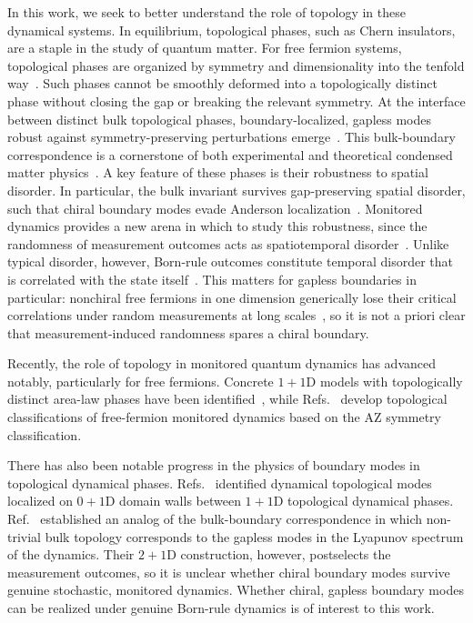 \documentclass[aps,prb,10pt,twocolumn,superscriptaddress,longbibliography,floatfix]{revtex4-2}
\newcommand{\claudeadd}[1]{{\color{orange}#1}}
\begin{document}
In this work, we seek to better understand the role of topology in these dynamical systems. In equilibrium, topological phases, such as Chern insulators, are a staple in
the study of quantum matter. For free fermion systems, topological phases are \claudeadd{organized by symmetry and dimensionality into the tenfold way}~\cite{AltlandZirnbauer1997,SchnyderRyuFurusakiLudwig2008,Kitaev2009,RyuSchnyderFurusakiLudwig2010,ChiuTeoSchnyderRyu2016}.
Such phases cannot be smoothly deformed into a topologically distinct phase without closing the gap or breaking the relevant symmetry. At the interface between distinct bulk topological phases, boundary-localized, gapless modes robust against symmetry-preserving
perturbations emerge~\cite{Halperin1982,Hatsugai1993,TeoKane2010}. This bulk-boundary correspondence is a cornerstone of both experimental and theoretical condensed matter physics~\cite{HasanKane2010,QiZhang2011}. A key feature of these phases is their robustness to spatial disorder. In particular, the bulk invariant survives gap-preserving spatial disorder, such that chiral boundary modes 
evade Anderson localization~\cite{Halperin1982,EversMirlin2008}. Monitored dynamics provides a new arena in which to study this robustness, since the randomness of measurement outcomes acts as spatiotemporal disorder~\cite{JianBauerKeselmanLudwig2022}. \claudeadd{Unlike typical disorder, however, Born-rule outcomes constitute temporal disorder that is correlated with the state itself}~\cite{JianShapourianBauerLudwig2023,FavaEtAl2023}. \claudeadd{This matters for gapless boundaries in particular: nonchiral free fermions in one dimension generically lose their critical correlations under random measurements at long scales~\cite{PoboikoEtAl2023}, so it is not a priori clear that measurement-induced randomness spares a chiral boundary.}

Recently, the role of topology in monitored quantum dynamics has advanced notably, particularly for free fermions. Concrete $1+1$D models with topologically distinct area-law phases have been identified~\cite{KellsMeidanRomito2023,BehrendsVennBeri2024,PanShapourianJian2025,Oshima2025, yang2026decoding}, while Refs.~\cite{BhuiyanPanJian2026,XiaoKawabata2026} develop topological classifications of free-fermion monitored dynamics based on the AZ symmetry classification.

There has also been notable progress in the physics of boundary modes in topological dynamical phases.  Refs.~\cite{PanShapourianJian2025, Oshima2025} identified dynamical topological modes localized on $0+1$D domain walls between $1+1$D topological dynamical phases. Ref.~\cite{XiaoKawabata2026}
established an analog of the bulk-boundary correspondence in which non-trivial bulk topology corresponds to the gapless modes in the Lyapunov spectrum of the dynamics. Their $2+1$D construction, however, postselects the measurement outcomes, so it is unclear whether chiral boundary modes survive genuine stochastic, monitored dynamics. Whether chiral, gapless boundary modes can be realized under genuine Born-rule dynamics is of interest to this work.
\end{document}
